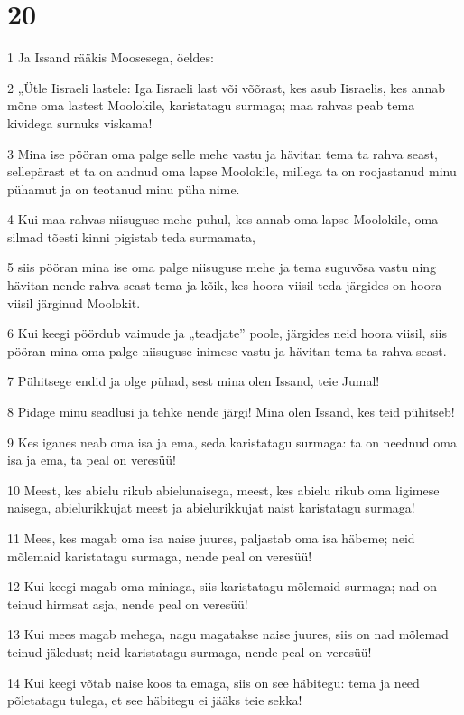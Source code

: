 \chapter{20}

\par 1 Ja Issand rääkis Moosesega, öeldes:
\par 2 „Ütle Iisraeli lastele: Iga Iisraeli last või võõrast, kes asub Iisraelis, kes annab mõne oma lastest Moolokile, karistatagu surmaga; maa rahvas peab tema kividega surnuks viskama!
\par 3 Mina ise pööran oma palge selle mehe vastu ja hävitan tema ta rahva seast, sellepärast et ta on andnud oma lapse Moolokile, millega ta on roojastanud minu pühamut ja on teotanud minu püha nime.
\par 4 Kui maa rahvas niisuguse mehe puhul, kes annab oma lapse Moolokile, oma silmad tõesti kinni pigistab teda surmamata,
\par 5 siis pööran mina ise oma palge niisuguse mehe ja tema suguvõsa vastu ning hävitan nende rahva seast tema ja kõik, kes hoora viisil teda järgides on hoora viisil järginud Moolokit.
\par 6 Kui keegi pöördub vaimude ja „teadjate” poole, järgides neid hoora viisil, siis pööran mina oma palge niisuguse inimese vastu ja hävitan tema ta rahva seast.
\par 7 Pühitsege endid ja olge pühad, sest mina olen Issand, teie Jumal!
\par 8 Pidage minu seadlusi ja tehke nende järgi! Mina olen Issand, kes teid pühitseb!
\par 9 Kes iganes neab oma isa ja ema, seda karistatagu surmaga: ta on neednud oma isa ja ema, ta peal on veresüü!
\par 10 Meest, kes abielu rikub abielunaisega, meest, kes abielu rikub oma ligimese naisega, abielurikkujat meest ja abielurikkujat naist karistatagu surmaga!
\par 11 Mees, kes magab oma isa naise juures, paljastab oma isa häbeme; neid mõlemaid karistatagu surmaga, nende peal on veresüü!
\par 12 Kui keegi magab oma miniaga, siis karistatagu mõlemaid surmaga; nad on teinud hirmsat asja, nende peal on veresüü!
\par 13 Kui mees magab mehega, nagu magatakse naise juures, siis on nad mõlemad teinud jäledust; neid karistatagu surmaga, nende peal on veresüü!
\par 14 Kui keegi võtab naise koos ta emaga, siis on see häbitegu: tema ja need põletatagu tulega, et see häbitegu ei jääks teie sekka!
